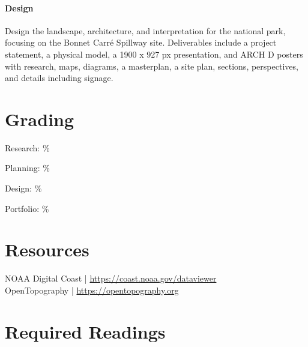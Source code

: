 \documentclass[11pt,article,oneside]{memoir}
\begin{document}
\paragraph{Design}
Design the landscape, architecture, and interpretation 
for the national park,
focusing on the Bonnet Carré Spillway site. 
Deliverables include 
a project statement, 
a physical model,
a 1900 x 927 px presentation,
and ARCH D posters
with research, maps, diagrams, a masterplan, a site plan,
sections, perspectives, and details including signage.

\section{Grading}

\noindent
\begin{minipage}[t]{0.225\linewidth}
Research: \%
\end{minipage}
\hfill
\begin{minipage}[t]{0.225\linewidth}
Planning: \%
\end{minipage}
\hfill
\begin{minipage}[t]{0.225\linewidth}
Design: \%
\end{minipage}
\hfill
\begin{minipage}[t]{0.225\linewidth}
Portfolio: \%
\end{minipage}

\section{Resources}
NOAA Digital Coast | \url{https://coast.noaa.gov/dataviewer}\\
OpenTopography | \url{https://opentopography.org}\\

\clearpage

\section{Required Readings}
\vspace*{0.5cm}
\nocite{*}
\setlength{}
\printbibliography[keyword=required, heading=none]

\end{document}
